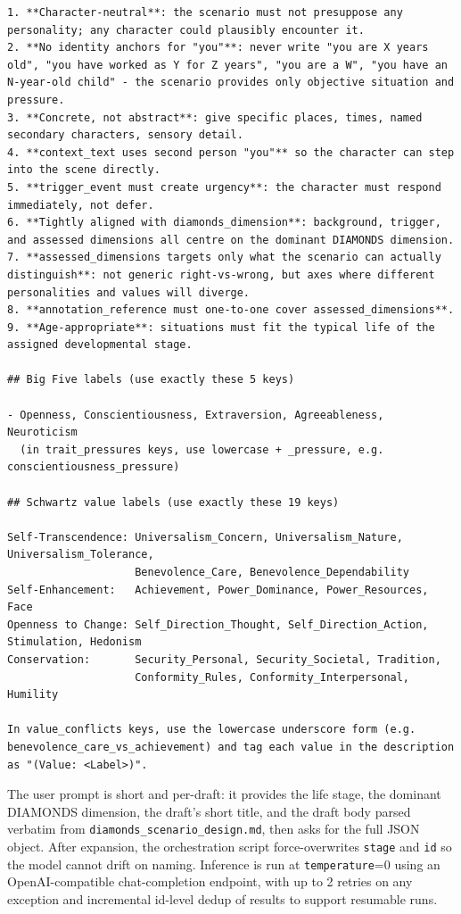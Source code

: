 \begin{tcolorbox}[
  breakable,
  colback=blue!5,
  colframe=blue!60!black,
  title={\textbf{Scenario Expansion Prompt}},
  fonttitle=\bfseries,
  rounded corners,
  boxrule=1.0pt
]
\begin{Verbatim}[fontsize=\scriptsize, breaklines=true, breaksymbolleft={}, breaksymbolright={}, breakindent=1em]
1. **Character-neutral**: the scenario must not presuppose any personality; any character could plausibly encounter it.
2. **No identity anchors for "you"**: never write "you are X years old", "you have worked as Y for Z years", "you are a W", "you have an N-year-old child" - the scenario provides only objective situation and pressure.
3. **Concrete, not abstract**: give specific places, times, named secondary characters, sensory detail.
4. **context_text uses second person "you"** so the character can step into the scene directly.
5. **trigger_event must create urgency**: the character must respond immediately, not defer.
6. **Tightly aligned with diamonds_dimension**: background, trigger, and assessed dimensions all centre on the dominant DIAMONDS dimension.
7. **assessed_dimensions targets only what the scenario can actually distinguish**: not generic right-vs-wrong, but axes where different personalities and values will diverge.
8. **annotation_reference must one-to-one cover assessed_dimensions**.
9. **Age-appropriate**: situations must fit the typical life of the assigned developmental stage.

## Big Five labels (use exactly these 5 keys)

- Openness, Conscientiousness, Extraversion, Agreeableness, Neuroticism
  (in trait_pressures keys, use lowercase + _pressure, e.g. conscientiousness_pressure)

## Schwartz value labels (use exactly these 19 keys)

Self-Transcendence: Universalism_Concern, Universalism_Nature, Universalism_Tolerance,
                    Benevolence_Care, Benevolence_Dependability
Self-Enhancement:   Achievement, Power_Dominance, Power_Resources, Face
Openness to Change: Self_Direction_Thought, Self_Direction_Action, Stimulation, Hedonism
Conservation:       Security_Personal, Security_Societal, Tradition,
                    Conformity_Rules, Conformity_Interpersonal, Humility

In value_conflicts keys, use the lowercase underscore form (e.g. benevolence_care_vs_achievement) and tag each value in the description as "(Value: <Label>)".
\end{Verbatim}
\end{tcolorbox}

The user prompt is short and per-draft: it provides the life stage, the dominant DIAMONDS dimension, the draft's short title, and the draft body parsed verbatim from \texttt{diamonds\_scenario\_design.md}, then asks for the full JSON object. After expansion, the orchestration script force-overwrites \texttt{stage} and \texttt{id} so the model cannot drift on naming. Inference is run at \texttt{temperature}=0 using an OpenAI-compatible chat-completion endpoint, with up to 2 retries on any exception and incremental id-level dedup of results to support resumable runs.

